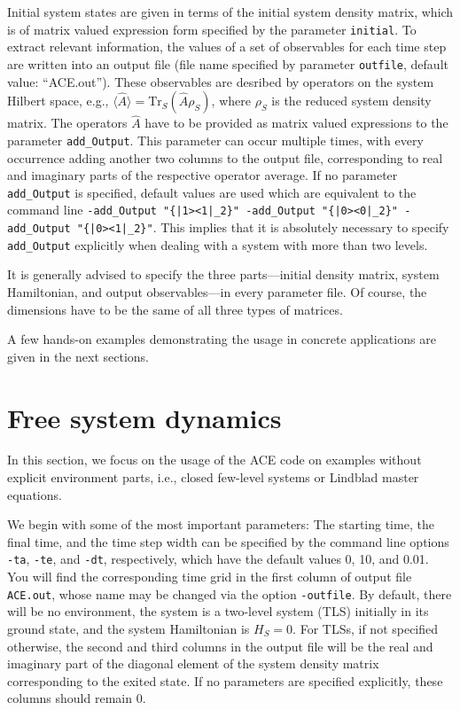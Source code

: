 \documentclass{scrartcl}
\begin{document}
Initial system states are given in terms of the initial system density matrix,
which is of matrix valued expression form specified by the parameter
\texttt{initial}.
To extract relevant information, the values of a set of observables for 
each time step are written into an output file (file name specified by
parameter \texttt{outfile}, default value: ``ACE.out'').
These observables are desribed by operators on the system Hilbert space, e.g., 
$\langle \hat{A}\rangle = \textrm{Tr}_S( \hat{A} \rho_S)$, 
where $\rho_S$ is the reduced system density matrix. 
The operators $\hat{A}$ have to be provided as matrix valued expressions
to the parameter \verb+add_Output+. This parameter can occur 
multiple times, with every occurrence adding another two columns to the output
file, corresponding to real and imaginary parts of the respective operator
average. If no parameter \verb+add_Output+ is specified, default values are
used which are equivalent to the command line
\verb+-add_Output "{|1><1|_2}" -add_Output "{|0><0|_2}" -add_Output "{|0><1|_2}"+. 
This implies that it is absolutely necessary to specify \verb+add_Output+
explicitly when dealing with a system with more than two levels.

It is generally advised to specify the three parts---initial 
density matrix, system Hamiltonian, and output observables---in every 
parameter file. Of course, the dimensions have to be the same of all 
three types of matrices.


A few hands-on examples demonstrating the usage in concrete applications are
given in the next sections.

\section{Free system dynamics}

In this section, we focus on the usage of the ACE code
on examples without explicit environment parts,
i.e., closed few-level systems or Lindblad master equations.

We begin with some of the most important parameters:
The starting time, the final time, and the time step width can be specified
by the command line options \texttt{-ta}, \texttt{-te}, and \texttt{-dt}, 
respectively, which have the default values 0, 10, and 0.01.
You will find the corresponding time grid in the first column of output file
\texttt{ACE.out}, whose name may be changed via the option \texttt{-outfile}.
By default, there will be no environment, the system is a two-level system
(TLS) initially in its ground state, and the system Hamiltonian is $H_S=0$. 
For TLSs, if not specified otherwise, the second and third
columns in the output file will be the real and imaginary part of the 
diagonal element of the system density matrix corresponding to the exited state.
If no parameters are specified explicitly, these columns should remain 0.
\end{document}
